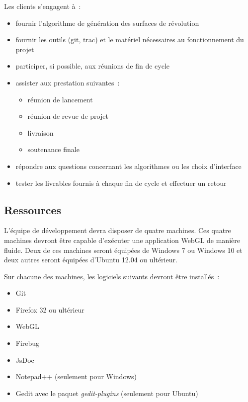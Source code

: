 \documentclass{scrartcl}
\begin{document}
		\bigskip %
		
		Les clients s'engagent à~:
			
		\medskip
		
		\begin{itemize}
			\item fournir l'algorithme de génération des surfaces de révolution
			\item fournir les outils (git, trac) et le matériel nécessaires au fonctionnement du projet
			\item participer, si possible, aux réunions de fin de cycle
			\item assister aux prestation suivantes~:
				\begin{itemize} 
					\item[\textasteriskcentered] réunion de lancement
					\item[\textasteriskcentered] réunion de revue de projet
					\item[\textasteriskcentered] livraison
					\item[\textasteriskcentered] soutenance finale
				\end{itemize}
			\item répondre aux questions concernant les algorithmes ou les choix d'interface
			\item tester les livrables fournis à chaque fin de cycle et effectuer un retour
		\end{itemize}  


	\subsection{Ressources}
		L'équipe de développement devra disposer de quatre machines. Ces quatre machines devront être capable d'exécuter une application WebGL de manière fluide.
		Deux de ces machines seront équipées de Windows 7 ou Windows 10 et deux autres seront équipées d'Ubuntu 12.04 ou ultérieur.

		Sur chacune des machines, les logiciels suivants devront être installés~:
		\medskip
		
		\begin{itemize}
			\item Git
			\item Firefox 32 ou ultérieur
			\item WebGL
			\item Firebug
			\item JsDoc
			\item Notepad++ (seulement pour Windows)
			\item Gedit avec le paquet \emph{gedit-plugins} (seulement pour Ubuntu)
		\end{itemize}
\end{document}
